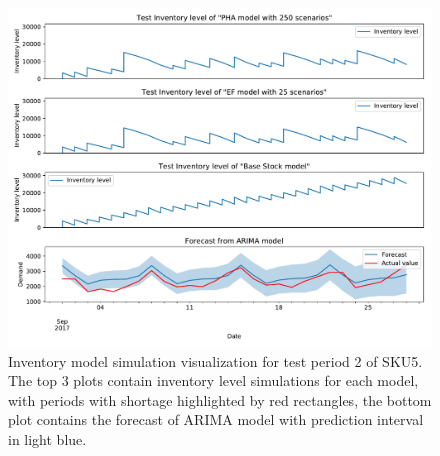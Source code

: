 \documentclass[11pt,a4paper]{article}
\begin{document}
\begin{figure}
  \includegraphics[width=1\linewidth]{figures/cost_sku5_2.pdf}
  \caption[Inventory model simulation visualization for test period 2 of SKU5]{Inventory model simulation visualization for test period 2 of SKU5. The top 3 plots contain inventory level simulations for each model, with periods with shortage highlighted by red rectangles, the bottom plot contains the forecast of ARIMA model with prediction interval in light blue.}
  \label{fig:cost_sku5_p2}
\end{figure}

\newpage
\end{document}
